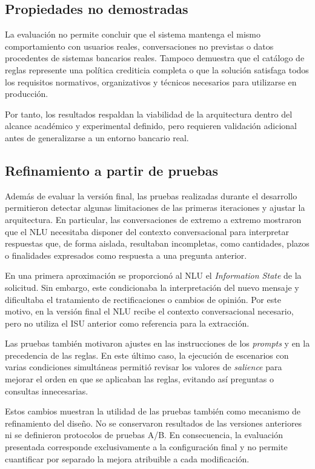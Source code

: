 \documentclass[12pt,a4paper]{report}
\begin{document}
\subsection{Propiedades no demostradas}

La evaluación no permite concluir que el sistema mantenga el mismo comportamiento con usuarios reales, conversaciones no previstas o datos procedentes de sistemas bancarios reales. Tampoco demuestra que el catálogo de reglas represente una política crediticia completa o que la solución satisfaga todos los requisitos normativos, organizativos y técnicos necesarios para utilizarse en producción. 

Por tanto, los resultados respaldan la viabilidad de la arquitectura dentro del alcance académico y experimental definido, pero requieren validación adicional antes de generalizarse a un entorno bancario real.

\subsection{Refinamiento a partir de pruebas}

Además de evaluar la versión final, las pruebas realizadas durante el desarrollo permitieron detectar algunas limitaciones de las primeras iteraciones y ajustar la arquitectura. En particular, las conversaciones de extremo a extremo mostraron que el NLU necesitaba disponer del contexto conversacional para interpretar respuestas que, de forma aislada, resultaban incompletas, como cantidades, plazos o finalidades expresados como respuesta a una pregunta anterior. 

En una primera aproximación se proporcionó al NLU el \textit{Information State} de la solicitud. Sin embargo, este condicionaba la interpretación del nuevo mensaje y dificultaba el tratamiento de rectificaciones o cambios de opinión. Por este motivo, en la versión final el NLU recibe el contexto conversacional necesario, pero no utiliza el ISU anterior como referencia para la extracción.

Las pruebas también motivaron ajustes en las instrucciones de los \textit{prompts} y en la precedencia de las reglas. En este último caso, la ejecución de escenarios con varias condiciones simultáneas permitió revisar los valores de \textit{salience} para mejorar el orden en que se aplicaban las reglas, evitando así preguntas o consultas innecesarias.

Estos cambios muestran la utilidad de las pruebas también como mecanismo de refinamiento del diseño. No se conservaron resultados de las versiones anteriores ni se definieron protocolos de pruebas A/B. En consecuencia, la evaluación presentada corresponde exclusivamente a la configuración final y no permite cuantificar por separado la mejora atribuible a cada modificación.
\end{document}
